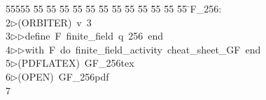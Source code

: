 %
%
\begin{tabbing}
55555 \= 55 \= 55 \= 55 \= 55 \= 55 \= 55 \= 55 \= 55 \= 55 \= 55 \= 55 \= 55 \= \>F\_256:\\[0pt]
2\>$\triangleright$\>(ORBITER)\ v\ 3\ \\[0pt]
3\>$\triangleright$\>$\triangleright$\>define\ F\ finite\_field\ q\ 256\ end\ \\[0pt]
4\>$\triangleright$\>$\triangleright$\>with\ F\ do\ finite\_field\_activity\ cheat\_sheet\_GF\ end\\[0pt]
5\>$\triangleright$\>(PDFLATEX)\ GF\_256tex\\[0pt]
6\>$\triangleright$\>(OPEN)\ GF\_256pdf\\[0pt]
7\>\end{tabbing}
